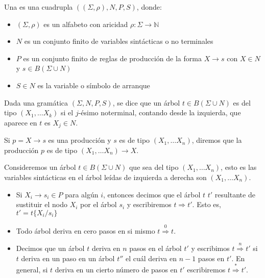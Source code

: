 \begin{definition}
Una  es una cuadrupla $((\Sigma, \rho), N, P, S)$, 
donde:
\begin{itemize}
\item
$(\Sigma, \rho)$ es un alfabeto con aricidad $\rho: \Sigma \rightarrow \mathds{N}$
\item
$N$ es un conjunto finito de variables sintácticas o no terminales
\item
$P$ es un conjunto finito de reglas de producción de la forma
$X \rightarrow s$ con $X \in N$ y $s \in B(\Sigma \cup N)$
\item
$S \in N$ es la variable o símbolo de arranque
\end{itemize}


\end{definition}

\begin{definition}
Dada una gramática $(\Sigma, N, P, S)$,
se dice que un árbol $t \in B(\Sigma \cup N)$ es del tipo $(X_1, \ldots X_k)$
si el $j$-ésimo noterminal, contando desde la izquierda, que aparece en $t$
es $X_j \in N$. 

Si $p = X \rightarrow s$ es una producción y $s$ es de tipo $(X_1, \ldots X_n)$,
diremos que la producción $p$ es de tipo $(X_1, \ldots X_n) \rightarrow X$.
\end{definition}

\begin{definition}
Consideremos un árbol  $t \in B(\Sigma \cup N)$
que sea del tipo $(X_1, \ldots X_n)$, esto es las variables sintácticas
en el árbol leídas de izquierda a derecha son $(X_1, \ldots X_n)$.

\begin{itemize}
\item
Si $X_i \rightarrow s_i \in P$ para algún $i$, entonces 
decimos que el árbol $t$ 
$t'$ resultante de sustituir el nodo $X_i$ por el árbol $s_i$ y escribiremos
$t \Longrightarrow t'$.  Esto es, $t' = t\{X_i/s_i\}$
\item
Todo árbol deriva en cero pasos
en si mismo $t \stackrel{0}{\Longrightarrow} t$. 
\item
Decimos que un árbol $t$ deriva en $n$ pasos en el árbol $t'$
y escribimos $t \stackrel{n}{\Longrightarrow} t'$
si $t$ deriva en un paso en un árbol $t''$ el cuál deriva en $n-1$ pasos en $t'$.
En general, si $t$ deriva en un cierto número de pasos en $t'$ escribiremos
$t \stackrel{*}{\Longrightarrow} t'$.
\end{itemize}
\end{definition}

